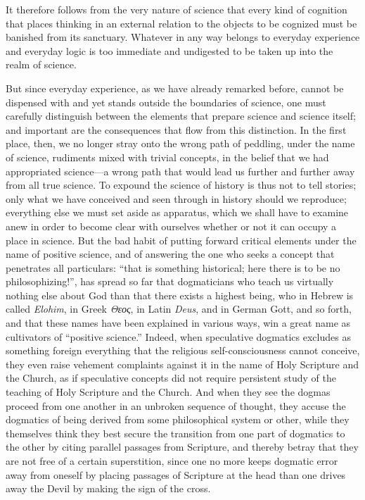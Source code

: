 \documentclass[12pt]{book}
\newcommand{\opage}[1]{\marginnote{\footnotesize\textit{[#1]}}}
\begin{document}
It therefore follows from the very nature of science that every kind of
cognition that places thinking in an external relation to the objects to be
cognized must be banished from its sanctuary. Whatever in any way belongs to
everyday experience and everyday logic is too immediate and undigested to be
taken up into the realm of science.

But since everyday experience, as we have already remarked before, cannot be
dispensed with and yet stands outside the boundaries of science, one must
carefully distinguish between the elements that prepare science and science
itself; and important are the consequences that flow from this distinction.
\opage{33} In the first place, then, we no longer stray onto the wrong path of
peddling, under the name of science, rudiments mixed with trivial concepts, in
the belief that we had appropriated science---a wrong path that would lead us
further and further away from all true science. To expound the science of
history is thus not to tell stories; only what we have conceived and seen
through in history should we reproduce; everything else we must set aside as
apparatus, which we shall have to examine anew in order to become clear with
ourselves whether or not it can occupy a place in science. But the bad habit of
putting forward critical elements under the name of positive science, and of
answering the one who seeks a concept that penetrates all particulars: ``that
is something historical; here there is to be no philosophizing!'', has spread
so far that dogmaticians who teach us virtually nothing else about God than
that there exists a highest being, who in Hebrew is called \emph{Elohim}, in
Greek \textit{Θεος}, in Latin \textit{Deus}, and in German Gott, and so forth,
and that these names have been explained in various ways, win a great name as
cultivators of ``positive science.'' Indeed, when speculative dogmatics
excludes as something foreign everything that the religious self-consciousness
cannot conceive, they even raise vehement complaints against it in the name of
Holy Scripture and the Church, as if speculative concepts did not require
persistent study of the teaching of Holy Scripture and the Church. And when
they see the dogmas proceed from one another in an unbroken sequence of
thought, they accuse the dogmatics of being derived from some philosophical
system or other, while they themselves think they best secure the transition
from one part of dogmatics to the other by citing parallel passages from
Scripture, and thereby betray that they are not free of a certain superstition,
since one no more keeps dogmatic error away from oneself by placing
\opage{34} passages of Scripture at the head than one drives away the Devil by
making the sign of the cross.
\end{document}
